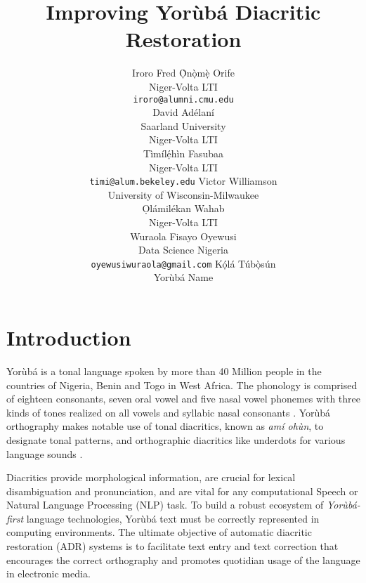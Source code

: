 \documentclass{article} %
\title{Improving Yor{\`u}b{\'a} Diacritic Restoration}
\author{Iroro Fred \d{\`O}n\d{\`o}m\d{\`e} Orife \\
Niger-Volta LTI\\
\texttt{iroro@alumni.cmu.edu} \\
\And
David Ad{\'e}lan{\'i} \\
Saarland University\\
Niger-Volta LTI \\
\And
T{\`i}m{\'i}l\d{\'{e}}h{\`i}n Fasubaa \\
Niger-Volta LTI \\
\texttt{timi@alum.bekeley.edu}
\And
Victor Williamson \\
University of Wisconsin-Milwaukee \\
\And
\d{O}l{\'a}mil{\'e}kan Wahab \\
Niger-Volta LTI \\
\And
Wuraola Fisayo Oyewusi\\
Data Science Nigeria \\
\texttt{oyewusiwuraola@gmail.com}
\And
K\d{\'{o}}l\'{a} T\'{u}b\d{\`{o}}s\'{u}n \\
Yor{\`u}b{\'a} Name \\
}
\begin{document}
\maketitle


\section{Introduction}\label{sec:introduction}

Yor{\`u}b{\'a} is a tonal language spoken by more than 40 Million people in the countries of Nigeria, Benin and Togo in West Africa. The phonology is comprised of eighteen consonants, seven oral vowel and five nasal vowel phonemes with three kinds of tones realized on all vowels and syllabic nasal consonants \citep{akinlabi2004sound}. Yor{\`u}b{\'a} orthography makes notable use of tonal diacritics, known as \emph{am{\'i} oh{\`u}n}, to designate tonal patterns, and orthographic diacritics like underdots for various language sounds \citep{adegbola2012quantifying, wells2000orthographic}.

Diacritics provide morphological information, are crucial for lexical disambiguation and pronunciation, and are vital for any computational Speech or Natural Language Processing (NLP) task. To build a robust ecosystem of \emph{Yor{\`u}b{\'a}-first} language technologies, Yor{\`u}b{\'a} text must be correctly represented in computing environments. The ultimate objective of automatic diacritic restoration (ADR) systems is to facilitate text entry and text correction that encourages the correct orthography and promotes quotidian usage of the language in electronic media.
\end{document}
